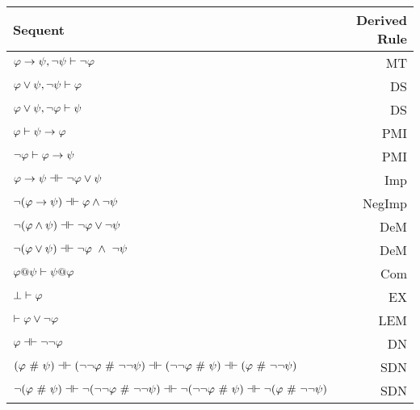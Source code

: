 \begin{center}
\begin{tabular}{l  r}
\textbf{Sequent}                    &       \textbf{Derived Rule} \\ \hline
$\mathcal{\varphi} \rightarrow \mathcal{\psi},  \neg\mathcal{\psi} \vdash \neg \mathcal{\varphi}$   &                       MT  \\
$\mathcal{\varphi} \vee \mathcal{\psi},  \neg\mathcal{\psi} \vdash \mathcal{\varphi}$ & DS\\
$\mathcal{\varphi} \vee \mathcal{\psi},  \neg\mathcal{\varphi}\vdash \mathcal{\psi}$    &      DS  \\
$\mathcal{\varphi} \vdash\mathcal{\psi} \rightarrow \mathcal{\varphi}$  &              PMI  \\
$\neg\mathcal{\varphi}\vdash\mathcal{\varphi}\rightarrow \mathcal{\psi}$  & PMI\\
$\meta{\varphi} \rightarrow\meta{\psi} \pequiv \enot\meta{\varphi}\eor \meta{\psi}$  &                   Imp   \\
$\enot (\meta{\varphi} \rightarrow \meta{\psi}) \pequiv \meta{\varphi} \eand \enot \meta{\psi}$  &               NegImp  \\
$\enot (\meta{\varphi} \eand \meta{\psi})  \pequiv \enot\meta{\varphi}\eor \enot \meta{\psi}$  &                DeM  \\
$\enot (\meta{\varphi} \eor \meta{\psi}) \pequiv \enot\meta{\varphi}\ \eand \ \enot \meta{\psi}$   &               DeM  \\
$\mathcal{\varphi} @ \mathcal{\psi}  \vdash  \mathcal{\psi} @ \mathcal{\varphi}$ &                          Com \\
$\bot \vdash \mathcal{\varphi}$ & EX \\
 $\vdash \mathcal{\varphi}\vee \neg \mathcal{\varphi}$ &                                                    LEM \\
 $\meta{\varphi} \pequiv \enot \enot \meta{\varphi}$     &                              DN  \\
$(\meta{\varphi}  \ \#\  \meta{\psi}) \pequiv (\enot \enot \meta{\varphi}  \ \#\   \enot \enot \meta{\psi}) \pequiv (\enot \enot \meta{\varphi}  \ \#\  \meta{\psi}) \pequiv (\meta{\varphi}  \ \#\  \enot \enot  \meta{\psi})$ & SDN\\
$\enot (\meta{\varphi}  \ \#\  \meta{\psi}) \pequiv \enot (\enot \enot \meta{\varphi}  \ \#\   \enot \enot \meta{\psi}) \pequiv \enot (\enot \enot \meta{\varphi}  \ \#\  \meta{\psi}) \pequiv \enot (\meta{\varphi}  \ \#\  \enot \enot  \meta{\psi})$ & SDN\\
\end{tabular}
\end{center}

